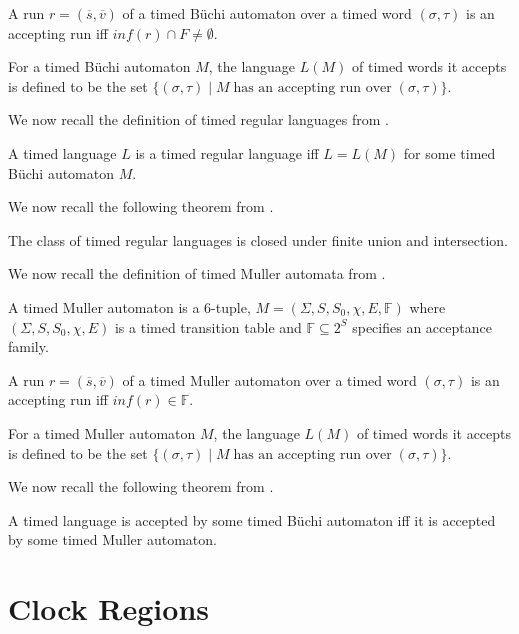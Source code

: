 A run $r = (\overline{s}, \overline{v})$ of a timed B{\"u}chi automaton over a timed word $(\sigma, \tau)$ is an accepting run iff $inf(r) \cap F \neq \emptyset$.

For a timed B{\"u}chi automaton $M$, the language $L(M)$ of timed words it accepts is defined to be the set $\lbrace (\sigma, \tau) \; \vert \; M \; \text{has an accepting run over} \; (\sigma, \tau) \rbrace$.

We now recall the definition of timed regular languages from \cite{1}.

\begin{definition}
A timed language $L$ is a timed regular language iff $L = L(M)$ for some timed B{\"u}chi automaton $M$.
\end{definition}

We now recall the following theorem from \cite{1}.

\begin{theorem}
The class of timed regular languages is closed under finite union and intersection.
\end{theorem}

We now recall the definition of timed Muller automata from \cite{1}.

\begin{definition}
A timed Muller automaton is a 6-tuple, $M = (\Sigma, S, S_{0}, \chi, E, \mathbb{F})$ where $(\Sigma, S, S_{0}, \chi, E)$ is a timed transition table and $\mathbb{F} \subseteq 2^{S}$ specifies an acceptance family.
\end{definition}

A run $r = (\overline{s}, \overline{v})$ of a timed Muller automaton over a timed word $(\sigma, \tau)$ is an accepting run iff $inf(r) \in \mathbb{F}$.

For a timed Muller automaton $M$, the language $L(M)$ of timed words it accepts is defined to be the set $\lbrace (\sigma, \tau) \; \vert \; M \; \text{has an accepting run over} \; (\sigma, \tau) \rbrace$.

We now recall the following theorem from \cite{1}.

\begin{theorem}
A timed language is accepted by some timed B{\"u}chi automaton iff it is accepted by some timed Muller automaton.
\end{theorem}

\section{Clock Regions}

